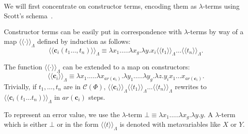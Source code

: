 \documentclass{LMCS}
\newcommand{\conone}{\mathbf{c}}
\newcommand{\termone}{t}
\newcommand{\cltermone}{X}
\newcommand{\cltermtwo}{Y}
\newcommand{\TRSonetolambdaI}[1]{\langle\!\langle #1\rangle\!\rangle_{\Lambdaterms}}
\newcommand{\errorterm}{\bot}
\newcommand{\arity}[1]{\mathit{ar}(#1)}
\newcommand{\Lambdaterms}{\Lambda}
\newcommand{\TRS}{\Phi}
\newcommand{\TRScontermsp}[1]{\mathcal{C}(#1)}
\newenvironment{varitemize}
{
\begin{list}{\labelitemi}
{\setlength{\itemsep}{0.0mm}
 \setlength{\topsep}{0.0mm}
 \setlength{\parindent}{0.0mm}
 \setlength{\parskip}{0.0mm}
 \setlength{\parsep}{0.0mm}
 \setlength{\partopsep}{0.0mm}
 \setlength{\leftmargin}{15pt}
 \setlength{\labelsep}{5pt}
 \setlength{\labelwidth}{10pt}}}
{
 \end{list} 
}
\begin{document}
We will first concentrate on constructor terms, encoding them as
$\lambda$-terms using Scott's schema~\cite{Wadsworth80}. 
\begin{defi}\label{Def-TRSonetolambdaI}
\begin{varitemize}
\item
  Constructor terms can be easily put in correspondence with $\lambda$-terms
  by way of a map $\TRSonetolambdaI{\cdot}$ defined by induction as follows:
  $$
  \TRSonetolambdaI{\conone_i(\termone_1\ldots,\termone_n)}\equiv
  \lambda x_1.\ldots.\lambda x_g.\lambda y.x_i\TRSonetolambdaI{\termone_1}\ldots\TRSonetolambdaI{\termone_n}.
  $$
\item
  The function $\TRSonetolambdaI{\cdot}$ can be extended to a map on constructors:
  $$
  \TRSonetolambdaI{\conone_i}\equiv\lambda x_1.\ldots.\lambda x_{\arity{\conone_i}}.
  \lambda y_1.\ldots.\lambda y_g.\lambda z.y_ix_1\ldots x_{\arity{\conone_i}}.
  $$
  Trivially, if  $\termone_1,\ldots,\termone_n$ are in $\TRScontermsp{\TRS}$,
  $\TRSonetolambdaI{\conone_i}\TRSonetolambdaI{\termone_1}\ldots\TRSonetolambdaI{\termone_n}$
  rewrites to $\TRSonetolambdaI{\conone_i(\termone_1\ldots\termone_n)}$ in
  $\arity{\conone_i}$ steps. 
\item
  To represent an error value, we use the $\lambda$-term
  $\errorterm \equiv
  \lambda x_1.\ldots.\lambda x_g.\lambda y.y$. A $\lambda$-term which is either $\errorterm$ or in
  the form $\TRSonetolambdaI{\termone}$ is denoted with metavariables like
  $\cltermone$ or $\cltermtwo$.
\end{varitemize}
\end{defi}
\end{document}
